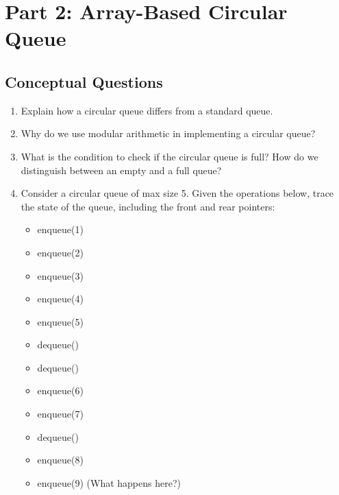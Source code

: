 \documentclass[12pt]{article}
\begin{document}
\section*{Part 2: Array-Based Circular Queue}

\subsection*{Conceptual Questions}
\begin{enumerate}
    \item Explain how a circular queue differs from a standard queue.
    
    \vspace{3cm}
    
    \item Why do we use modular arithmetic in implementing a circular queue?
    
    \vspace{3cm}
    
    \item What is the condition to check if the circular queue is full? How do we distinguish between an empty and a full queue?
    
    \vspace{3cm}
    
    \item Consider a circular queue of max size 5. Given the operations below, trace the state of the queue, including the front and rear pointers:
    \begin{itemize}
        \item enqueue(1)
        \item enqueue(2)
        \item enqueue(3)
        \item enqueue(4)
        \item enqueue(5)
        \item dequeue()
        \item dequeue()
        \item enqueue(6)
        \item enqueue(7)
        \item dequeue()
        \item enqueue(8)
        \item enqueue(9) (What happens here?)
    \end{itemize}
    
    \vspace{3cm}
    

\end{enumerate}
\end{document}

